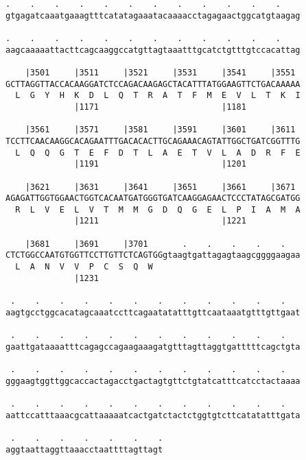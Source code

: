 \documentclass{article}
\begin{document}
\begin{Verbatim}
.    .    .    .    .    .    .    .    .    .    .    .    
gtgagatcaaatgaaagtttcatatagaaatacaaaacctagagaactggcatgtaagag
                                                            
.    .    .    .    .    .    .    .    .    .    .    .    
aagcaaaaattacttcagcaaggccatgttagtaaatttgcatctgtttgtccacattag
                                                            
    |3501     |3511     |3521     |3531     |3541     |3551 
GCTTAGGTTACCACAAGGATCTCCAGACAAGAGCTACATTTATGGAAGTTCTGACAAAAA
  L  G  Y  H  K  D  L  Q  T  R  A  T  F  M  E  V  L  T  K  I
              |1171                         |1181           
  
    |3561     |3571     |3581     |3591     |3601     |3611 
TCCTTCAACAAGGCACAGAATTTGACACACTTGCAGAAACAGTATTGGCTGATCGGTTTG
  L  Q  Q  G  T  E  F  D  T  L  A  E  T  V  L  A  D  R  F  E
              |1191                         |1201           
  
    |3621     |3631     |3641     |3651     |3661     |3671 
AGAGATTGGTGGAACTGGTCACAATGATGGGTGATCAAGGAGAACTCCCTATAGCGATGG
  R  L  V  E  L  V  T  M  M  G  D  Q  G  E  L  P  I  A  M  A
              |1211                         |1221           
  
    |3681     |3691     |3701       .    .    .    .    .   
CTCTGGCCAATGTGGTTCCTTGTTCTCAGTGGgtaagtgattagagtaagcggggaagaa
  L  A  N  V  V  P  C  S  Q  W                              
              |1231                                         
  
 .    .    .    .    .    .    .    .    .    .    .    .   
aagtgcctggcacatagcaaatccttcagaatatatttgttcaataaatgtttgttgaat
                                                            
 .    .    .    .    .    .    .    .    .    .    .    .   
gaattgataaaatttcagagccagaagaaagatgtttagttaggtgatttttcagctgta
                                                            
 .    .    .    .    .    .    .    .    .    .    .    .   
gggaagtggttggcaccactagacctgactagtgttctgtatcatttcatcctactaaaa
                                                            
 .    .    .    .    .    .    .    .    .    .    .    .   
aattccatttaaacgcattaaaaatcactgatctactctggtgtcttcatatatttgata
                                                            
 .    .    .    .    .    .    .
aggtaattaggttaaacctaattttagttagt
                                

\end{Verbatim}
\end{document}
